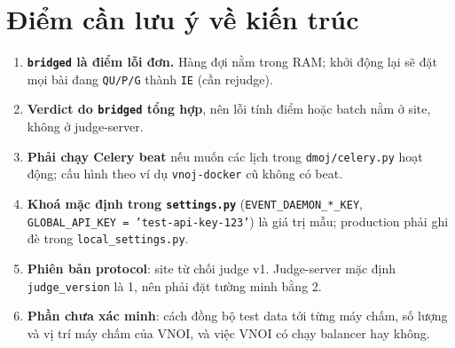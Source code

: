 \documentclass[11pt,a4paper]{article}
\renewcommand{\c}[1]{\texttt{#1}}
\begin{document}
\section{Điểm cần lưu ý về kiến trúc}
\begin{enumerate}[leftmargin=1.4em,itemsep=2pt]
\item \textbf{\c{bridged} là điểm lỗi đơn.} Hàng đợi nằm trong RAM; khởi động lại sẽ đặt mọi bài đang \c{QU/P/G} thành \c{IE} (cần rejudge).
\item \textbf{Verdict do \c{bridged} tổng hợp}, nên lỗi tính điểm hoặc batch nằm ở site, không ở judge-server.
\item \textbf{Phải chạy Celery beat} nếu muốn các lịch trong \c{dmoj/celery.py} hoạt động; cấu hình theo ví dụ \c{vnoj-docker} cũ không có beat.
\item \textbf{Khoá mặc định trong \c{settings.py}} (\c{EVENT\_DAEMON\_*\_KEY}, \c{GLOBAL\_API\_KEY = 'test-api-key-123'}) là giá trị mẫu; production phải ghi đè trong \c{local\_settings.py}.
\item \textbf{Phiên bản protocol}: site từ chối judge v1. Judge-server mặc định \c{judge\_version} là 1, nên phải đặt tường minh bằng 2.
\item \textbf{Phần chưa xác minh}: cách đồng bộ test data tới từng máy chấm, số lượng và vị trí máy chấm của VNOI, và việc VNOI có chạy balancer hay không.
\end{enumerate}
\end{document}
